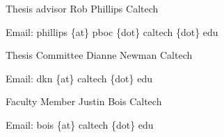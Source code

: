 


\begin{cventries}

\cventry
    {Thesis advisor}
    {Rob Phillips}
    {Caltech}
    {$\;$}
    {
      \begin{cvitems}
        \item {
            Email:  phillips \{at\} pboc \{dot\} caltech \{dot\} edu
        }
      \end{cvitems}
    }
\cventry
    {Thesis Committee}
    {Dianne Newman}
    {Caltech}
    {$\;$}
    {
      \begin{cvitems}
        \item {
            Email:  dkn \{at\} caltech \{dot\} edu
        }
      \end{cvitems}
    }
\cventry
    {Faculty Member}
    {Justin Bois}
    {Caltech}
    {$\;$}
    {
      \begin{cvitems}
        \item {
            Email:  bois \{at\} caltech \{dot\} edu
        }
      \end{cvitems}
    }

\end{cventries}